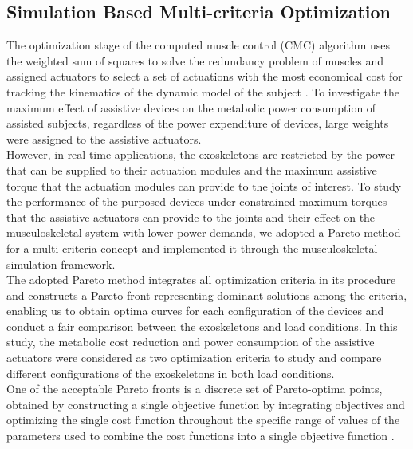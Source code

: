 \documentclass[10pt,letterpaper]{article}
\begin{document}
\subsection*{Simulation Based Multi-criteria Optimization}
The optimization stage of the computed muscle control (CMC) algorithm uses the weighted sum of squares to solve the redundancy problem of muscles and assigned actuators to select a set of actuations with the most economical cost for tracking the kinematics of the dynamic model of the subject \cite{92}. To investigate the maximum effect of assistive devices on the metabolic power consumption of assisted subjects, regardless of the power expenditure of devices, large weights were assigned to the assistive actuators.\\
However, in real-time applications, the exoskeletons are restricted by the power that can be supplied to their actuation modules and the maximum assistive torque that the actuation modules can provide to the joints of interest. To study the performance of the purposed devices under constrained maximum torques that the assistive actuators can provide to the joints and their effect on the musculoskeletal system with lower power demands, we adopted a Pareto method for a multi-criteria concept\cite{113} and implemented it through the musculoskeletal simulation framework.\\
The adopted Pareto method integrates all optimization criteria in its procedure and constructs a Pareto front representing dominant solutions among the criteria, enabling us to obtain optima curves for each configuration of the devices \cite{107} and conduct a fair comparison between the exoskeletons and load conditions. In this study, the metabolic cost reduction and power consumption of the assistive actuators were considered as two optimization criteria to study and compare different configurations of the exoskeletons in both load conditions.\\
One of the acceptable Pareto fronts is a discrete set of Pareto-optima points, obtained by constructing a single objective function by integrating objectives and optimizing the single cost function throughout the specific range of values of the parameters used to combine the cost functions into a single objective function \cite{108}.\\
\end{document}
